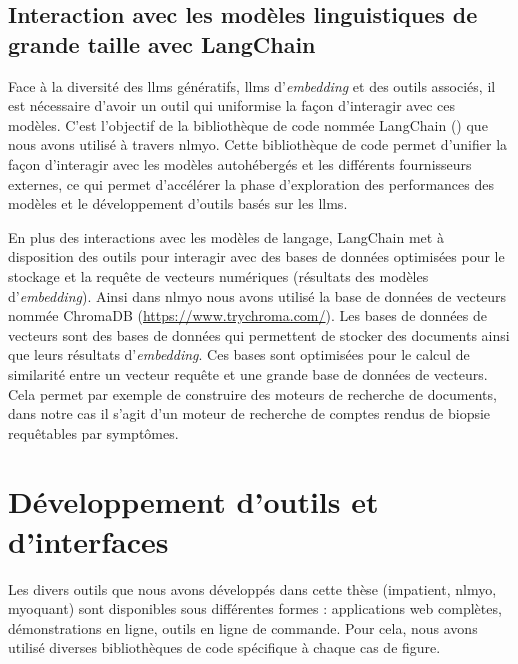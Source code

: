 \subsection{Interaction avec les modèles linguistiques de grande taille avec LangChain}

Face à la diversité des \gls{llms} génératifs, \gls{llms} d'\textit{embedding} et des outils associés, il est nécessaire d'avoir un outil qui uniformise la façon d'interagir avec ces modèles. C'est l'objectif de la bibliothèque de code nommée LangChain (\cite{chase_harrison_langchain_2022}) que nous avons utilisé à travers \gls{nlmyo}. Cette bibliothèque de code permet d'unifier la façon d'interagir avec les modèles autohébergés et les différents fournisseurs externes, ce qui permet d'accélérer la phase d'exploration des performances des modèles et le développement d'outils basés sur les \gls{llms}. 

En plus des interactions avec les modèles de langage, LangChain met à disposition des outils pour interagir avec des bases de données optimisées pour le stockage et la requête de vecteurs numériques (résultats des modèles d'\textit{embedding}). Ainsi dans \gls{nlmyo} nous avons utilisé la base de données de vecteurs nommée ChromaDB (\url{https://www.trychroma.com/}). Les bases de données de vecteurs sont des bases de données qui permettent de stocker des documents ainsi que leurs résultats d'\textit{embedding}. Ces bases sont optimisées pour le calcul de similarité entre un vecteur requête et une grande base de données de vecteurs. Cela permet par exemple de construire des moteurs de recherche de documents, dans notre cas il s'agit d'un moteur de recherche de comptes rendus de biopsie requêtables par symptômes.

\section{Développement d'outils et d'interfaces}
Les divers outils que nous avons développés dans cette thèse (\gls{impatient}, \gls{nlmyo}, \gls{myoquant}) sont disponibles sous différentes formes : applications web complètes, démonstrations en ligne, outils en ligne de commande.  Pour cela, nous avons utilisé diverses bibliothèques de code spécifique à chaque cas de figure.

